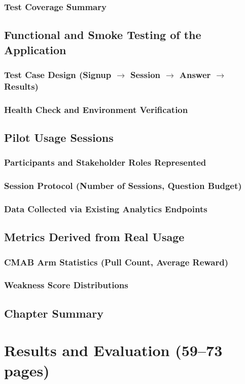 \documentclass[a4paper, 12pt, oneside, openany, BCOR1cm,toc=chapterentrywithdots]{scrbook}
\begin{document}
\subsection{Test Coverage Summary}
\section{Functional and Smoke Testing of the Application}
\subsection{Test Case Design (Signup $\to$ Session $\to$ Answer $\to$ Results)}
\subsection{Health Check and Environment Verification}
\section{Pilot Usage Sessions}
\subsection{Participants and Stakeholder Roles Represented}
\subsection{Session Protocol (Number of Sessions, Question Budget)}
\subsection{Data Collected via Existing Analytics Endpoints}
\section{Metrics Derived from Real Usage}
\subsection{CMAB Arm Statistics (Pull Count, Average Reward)}
\subsection{Weakness Score Distributions}
\section{Chapter Summary}

\chapter{Results and Evaluation (59--73 pages)}
\label{chap:results}
% 
\end{document}
